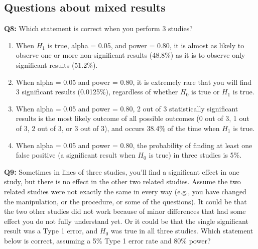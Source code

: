 \documentclass[
  oneside]{book}
\providecommand{\tightlist}{%
  \setlength{\itemsep}{0pt}\setlength{\parskip}{0pt}}
\begin{document}
\hypertarget{questions-about-mixed-results}{%
\subsection{Questions about mixed results}\label{questions-about-mixed-results}}

\textbf{Q8:} Which statement is correct when you perform 3 studies?

\begin{enumerate}
\def\labelenumi{\Alph{enumi})}
\tightlist
\item
  When \(H_1\) is true, alpha = 0.05, and power = 0.80, it is almost as likely to observe one or more non-significant results (48.8\%) as it is to observe only significant results (51.2\%).
\item
  When alpha = 0.05 and power = 0.80, it is extremely rare that you will find 3 significant results (0.0125\%), regardless of whether \(H_0\) is true or \(H_1\) is true.
\item
  When alpha = 0.05 and power = 0.80, 2 out of 3 statistically significant results is the most likely outcome of all possible outcomes (0 out of 3, 1 out of 3, 2 out of 3, or 3 out of 3), and occurs 38.4\% of the time when \(H_1\) is true.
\item
  When alpha = 0.05 and power = 0.80, the probability of finding at least one false positive (a significant result when \(H_0\) is true) in three studies is 5\%.
\end{enumerate}

\textbf{Q9:} Sometimes in lines of three studies, you'll find a significant effect in one study, but there is no effect in the other two related studies. Assume the two related studies were not exactly the same in every way (e.g., you have changed the manipulation, or the procedure, or some of the questions). It could be that the two other studies did not work because of minor differences that had some effect you do not fully understand yet. Or it could be that the single significant result was a Type 1 error, and \(H_0\) was true in all three studies. Which statement below is correct, assuming a 5\% Type 1 error rate and 80\% power?
\end{document}
